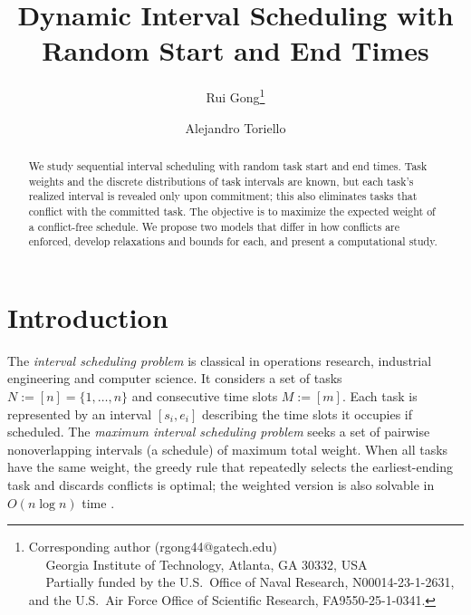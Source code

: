 \documentclass{article}
\title{Dynamic Interval Scheduling with Random Start and End Times%
} %
\author{Rui Gong\thanks{
Corresponding author (rgong44@gatech.edu)\\
\indent~~ Georgia Institute of Technology, Atlanta, GA 30332, USA\\
\indent~~ Partially funded by the U.S.\ Office of Naval Research, N00014-23-1-2631, and the U.S.\ Air Force Office of Scientific Research, FA9550-25-1-0341.} \and 
Alejandro Toriello}
\begin{document}
\maketitle

\begin{abstract}
\noindent
We study sequential interval scheduling with random task start and end times. Task weights and the discrete distributions of task intervals are known, but each task's realized interval is revealed only upon commitment;
this also eliminates tasks that conflict with the committed task.
The objective is to maximize the expected weight of a conflict-free schedule.
We propose two models that differ in how conflicts are enforced, develop relaxations and bounds for each, and present a computational study.
\end{abstract}

\section{Introduction}
The \emph{interval scheduling problem} is classical in operations research, industrial engineering and computer science.
It considers a set of tasks $N:=[n] = \{1, \dotsc, n\}$ and consecutive time slots $M:=[m]$.
Each task is represented by an interval $[s_i,e_i]$ describing the time slots it occupies if scheduled.
The \emph{maximum interval scheduling problem} seeks a set of pairwise nonoverlapping intervals (a schedule) of maximum total weight.
When all tasks have the same weight, the greedy rule that repeatedly selects the earliest-ending task and discards conflicts is optimal;
the weighted version is also solvable in $O(n\log n)$ time \cite{Kleinberg+Tardos:06a}.
\end{document}
